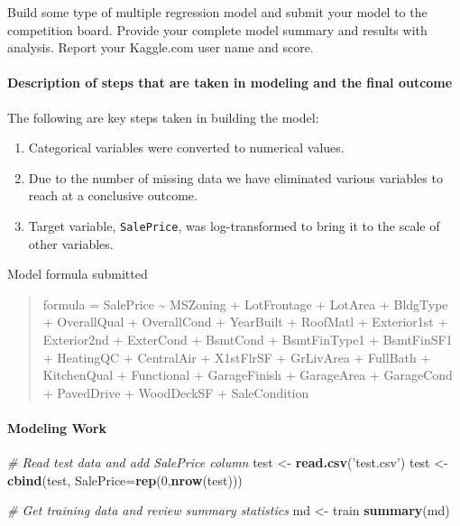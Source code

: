 \documentclass[]{article}
\newenvironment{Shaded}{\begin{snugshade}}{\end{snugshade}}
\newcommand{\CommentTok}[1]{\textcolor[rgb]{0.56,0.35,0.01}{\textit{#1}}}
\newcommand{\DataTypeTok}[1]{\textcolor[rgb]{0.13,0.29,0.53}{#1}}
\newcommand{\DecValTok}[1]{\textcolor[rgb]{0.00,0.00,0.81}{#1}}
\newcommand{\KeywordTok}[1]{\textcolor[rgb]{0.13,0.29,0.53}{\textbf{#1}}}
\newcommand{\NormalTok}[1]{#1}
\newcommand{\StringTok}[1]{\textcolor[rgb]{0.31,0.60,0.02}{#1}}
\providecommand{\tightlist}{%
  \setlength{\itemsep}{0pt}\setlength{\parskip}{0pt}}
\let\oldparagraph\paragraph
\renewcommand{\paragraph}[1]{\oldparagraph{#1}\mbox{}}
\begin{document}
Build some type of multiple regression model and submit your model to
the competition board. Provide your complete model summary and results
with analysis. Report your Kaggle.com user name and score.

\hypertarget{description-of-steps-that-are-taken-in-modeling-and-the-final-outcome}{%
\paragraph{Description of steps that are taken in modeling and the final
outcome}\label{description-of-steps-that-are-taken-in-modeling-and-the-final-outcome}}

The following are key steps taken in building the model:

\begin{enumerate}
\def\labelenumi{\arabic{enumi}.}
\tightlist
\item
  Categorical variables were converted to numerical values.
\item
  Due to the number of missing data we have eliminated various variables
  to reach at a conclusive outcome.\\
\item
  Target variable, \texttt{SalePrice}, was log-transformed to bring it
  to the scale of other variables.
\end{enumerate}

Model formula submitted

\begin{quote}
formula = SalePrice \textasciitilde{} MSZoning + LotFrontage + LotArea +
BldgType + OverallQual + OverallCond + YearBuilt + RoofMatl +
Exterior1st + Exterior2nd + ExterCond + BsmtCond + BsmtFinType1 +
BsmtFinSF1 + HeatingQC + CentralAir + X1stFlrSF + GrLivArea + FullBath +
KitchenQual + Functional + GarageFinish + GarageArea + GarageCond +
PavedDrive + WoodDeckSF + SaleCondition
\end{quote}

\hypertarget{modeling-work}{%
\paragraph{Modeling Work}\label{modeling-work}}

\begin{Shaded}
\begin{Highlighting}[]
\CommentTok{# Read test data and add SalePrice column}
\NormalTok{test <-}\StringTok{ }\KeywordTok{read.csv}\NormalTok{(}\StringTok{'test.csv'}\NormalTok{)}
\NormalTok{test <-}\StringTok{ }\KeywordTok{cbind}\NormalTok{(test, }\DataTypeTok{SalePrice=}\KeywordTok{rep}\NormalTok{(}\DecValTok{0}\NormalTok{,}\KeywordTok{nrow}\NormalTok{(test)))}

\CommentTok{# Get training data and review summary statistics}
\NormalTok{md <-}\StringTok{ }\NormalTok{train}
\KeywordTok{summary}\NormalTok{(md)}
\end{Highlighting}
\end{Shaded}
\end{document}
